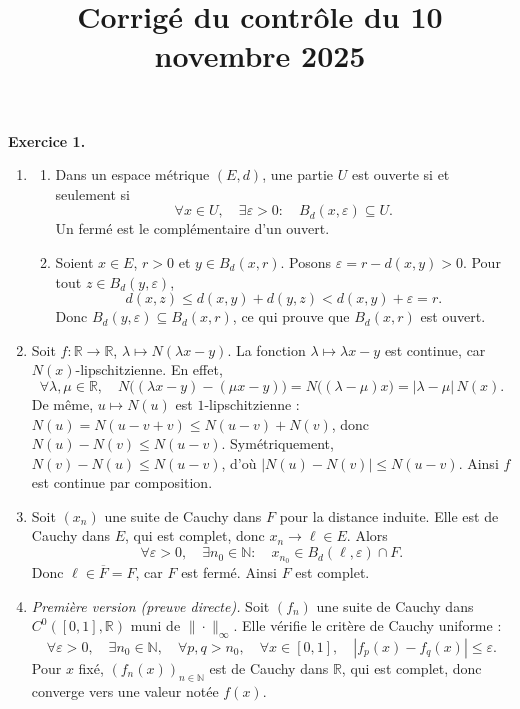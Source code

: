 \documentclass[11pt,a4paper]{article}
\title{Corrigé du contrôle du 10 novembre 2025}
\author{}
\date{}
\newcommand{\R}{\mathbb{R}}
\begin{document}
\maketitle
\noindent\textbf{Exercice 1.}
\begin{enumerate}[label=\arabic*.,leftmargin=*,itemsep=1em]
\item
  \begin{enumerate}[label=(\alph*),itemsep=.6em]
  \item Dans un espace métrique $(E,d)$, une partie $U$ est ouverte si et seulement si
  \[
    \forall x\in U,\quad \exists\varepsilon>0:\quad B_d(x,\varepsilon)\subseteq U.
  \]
  Un fermé est le complémentaire d'un ouvert.

  \item Soient $x\in E$, $r>0$ et $y\in B_d(x,r)$. Posons $\varepsilon=r-d(x,y)>0$. Pour tout $z\in B_d(y,\varepsilon)$,
  \[
    d(x,z)\leq d(x,y)+d(y,z)<d(x,y)+\varepsilon=r.
  \]
  Donc $B_d(y,\varepsilon)\subseteq B_d(x,r)$, ce qui prouve que $B_d(x,r)$ est ouvert.
  \end{enumerate}

\item Soit $f:\R\to\R$, $\lambda\mapsto N(\lambda x-y)$. La fonction $\lambda\mapsto\lambda x-y$ est continue, car $N(x)$-lipschitzienne. En effet,
\[
  \forall\lambda,\mu\in\R,\quad
  N\bigl((\lambda x-y)-(\mu x-y)\bigr)
  =N\bigl((\lambda-\mu)x\bigr)=|\lambda-\mu|\,N(x).
\]
De même, $u\mapsto N(u)$ est $1$-lipschitzienne : $N(u)=N(u-v+v)\leq N(u-v)+N(v)$, donc $N(u)-N(v)\leq N(u-v)$. Symétriquement, $N(v)-N(u)\leq N(u-v)$, d'où $|N(u)-N(v)|\leq N(u-v)$. Ainsi $f$ est continue par composition.

\item Soit $(x_n)$ une suite de Cauchy dans $F$ pour la distance induite. Elle est de Cauchy dans $E$, qui est complet, donc $x_n\to\ell\in E$. Alors
\[
  \forall\varepsilon>0,\quad \exists n_0\in\mathbb N:\quad
  x_{n_0}\in B_d(\ell,\varepsilon)\cap F.
\]
Donc $\ell\in\overline F=F$, car $F$ est fermé. Ainsi $F$ est complet.

\item \textit{Première version (preuve directe).} Soit $(f_n)$ une suite de Cauchy dans $C^0([0,1],\R)$ muni de $\|\cdot\|_\infty$. Elle vérifie le critère de Cauchy uniforme :
\[
  \forall\varepsilon>0,\quad \exists n_0\in\mathbb N,\quad
  \forall p,q>n_0,\quad \forall x\in[0,1],\quad
  |f_p(x)-f_q(x)|\leq\varepsilon.
\]
Pour $x$ fixé, $(f_n(x))_{n\in\mathbb N}$ est de Cauchy dans $\R$, qui est complet, donc converge vers une valeur notée $f(x)$.


\end{enumerate}
\end{document}
